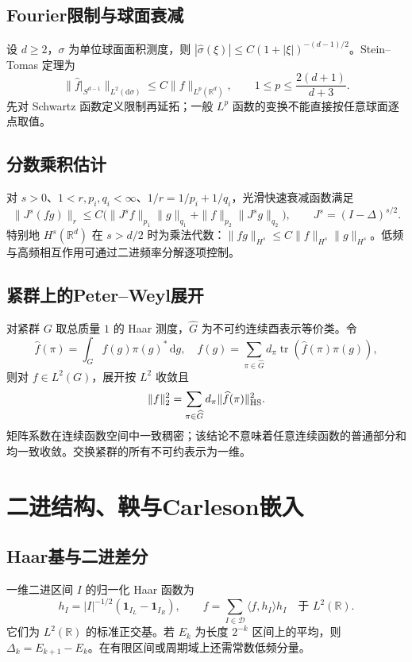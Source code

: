 \documentclass[../main.tex]{subfiles}
\begin{document}
\subsection{Fourier限制与球面衰减}
设 $d\ge2$，$\sigma$ 为单位球面面积测度，则 $|\widehat\sigma(\xi)|\le C(1+|\xi|)^{-(d-1)/2}$。Stein--Tomas 定理为
\[
\|\widehat f|_{S^{d-1}}\|_{L^2(\mathrm d\sigma)}\le C\|f\|_{L^p(\mathbb R^d)},\qquad
1\le p\le\frac{2(d+1)}{d+3}.
\]
先对 Schwartz 函数定义限制再延拓；一般 $L^p$ 函数的变换不能直接按任意球面逐点取值。
\subsection{分数乘积估计}
对 $s>0$、$1<r,p_i,q_i<\infty$、$1/r=1/p_i+1/q_i$，光滑快速衰减函数满足
\[
\|J^s(fg)\|_r\le C\bigl(\|J^sf\|_{p_1}\|g\|_{q_1}
+\|f\|_{p_2}\|J^sg\|_{q_2}\bigr),\qquad J^s=(I-\Delta)^{s/2}.
\]
特别地 $H^s(\mathbb R^d)$ 在 $s>d/2$ 时为乘法代数：$\|fg\|_{H^s}\le C\|f\|_{H^s}\|g\|_{H^s}$。低频与高频相互作用可通过二进频率分解逐项控制。
\subsection{紧群上的Peter--Weyl展开}
对紧群 $G$ 取总质量 $1$ 的 Haar 测度，$\widehat G$ 为不可约连续酉表示等价类。令
\[
\widehat f(\pi)=\int_Gf(g)\pi(g)^*\,\mathrm dg,
\quad f(g)=\sum_{\pi\in\widehat G}d_\pi\operatorname{tr}(\widehat f(\pi)\pi(g)),
\]
则对 $f\in L^2(G)$，展开按 $L^2$ 收敛且
\[
\|f\|_2^2=\sum_{\pi\in\widehat G}d_\pi\|\widehat f(\pi)\|_{\rm HS}^2.
\]
矩阵系数在连续函数空间中一致稠密；该结论不意味着任意连续函数的普通部分和均一致收敛。交换紧群的所有不可约表示为一维。

\section{二进结构、鞅与Carleson嵌入}
\subsection{Haar基与二进差分}
一维二进区间 $I$ 的归一化 Haar 函数为
\[
h_I=|I|^{-1/2}(\bm1_{I_L}-\bm1_{I_R}),\qquad
f=\sum_{I\in\mathcal D}\langle f,h_I\rangle h_I\quad\text{于 }L^2(\mathbb R).
\]
它们为 $L^2(\mathbb R)$ 的标准正交基。若 $E_k$ 为长度 $2^{-k}$ 区间上的平均，则 $\Delta_k=E_{k+1}-E_k$。在有限区间或周期域上还需常数低频分量。
\end{document}

